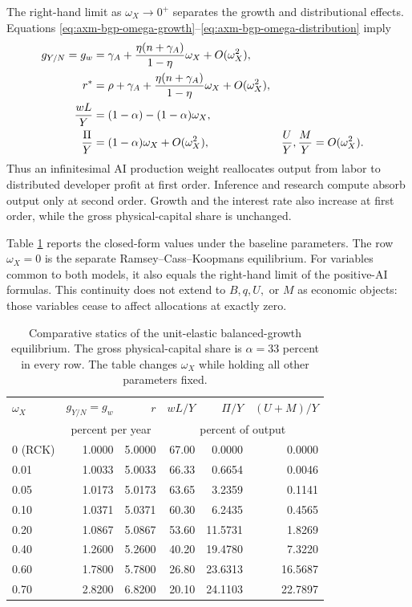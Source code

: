The right-hand limit as \(\omega_X\to0^+\) separates the growth and
distributional effects. Equations
\eqref{eq:axm-bgp-omega-growth}--\eqref{eq:axm-bgp-omega-distribution} imply
\begin{align}
 g_{Y/N}=g_w
 &=\gamma_A+\frac{\eta(n+\gamma_A)}{1-\eta}\omega_X
   +O(\omega_X^2),\notag\\
 r^*&=\rho+\gamma_A+\frac{\eta(n+\gamma_A)}{1-\eta}\omega_X
   +O(\omega_X^2),\notag\\
 \frac{wL}{Y}
 &=(1-\alpha)-(1-\alpha)\omega_X,\notag\\
 \frac{\Pi}{Y}&=(1-\alpha)\omega_X+O(\omega_X^2),
 &\frac{U}{Y},\frac{M}{Y}&=O(\omega_X^2).
 \label{eq:axm-bgp-near-zero}
\end{align}
Thus an infinitesimal AI production weight reallocates output from labor to
distributed developer profit at first order. Inference and research compute
absorb output only at second order. Growth and the interest rate also increase
at first order, while the gross physical-capital share is unchanged.

Table \ref{tab:axm-bgp-omega-comparative-statics} reports the closed-form
values under the baseline parameters. The row \(\omega_X=0\) is the separate
Ramsey--Cass--Koopmans equilibrium. For variables common to both models, it
also equals the right-hand limit of the positive-AI formulas. This continuity
does not extend to \(B,q,U,\) or \(M\) as economic objects: those variables
cease to affect allocations at exactly zero.

\begin{table}[H]
\centering
\small
\begin{tabular}{lrrrrr}
\toprule
\(\omega_X\) & \(g_{Y/N}=g_w\) & \(r\) & \(wL/Y\) & \(\Pi/Y\) & \((U+M)/Y\)\\
 & \multicolumn{2}{c}{percent per year} & \multicolumn{3}{c}{percent of output}\\
\midrule
0 (RCK) & 1.0000 & 5.0000 & 67.00 & 0.0000 & 0.0000\\
0.01 & 1.0033 & 5.0033 & 66.33 & 0.6654 & 0.0046\\
0.05 & 1.0173 & 5.0173 & 63.65 & 3.2359 & 0.1141\\
0.10 & 1.0371 & 5.0371 & 60.30 & 6.2435 & 0.4565\\
0.20 & 1.0867 & 5.0867 & 53.60 & 11.5731 & 1.8269\\
0.40 & 1.2600 & 5.2600 & 40.20 & 19.4780 & 7.3220\\
0.60 & 1.7800 & 5.7800 & 26.80 & 23.6313 & 16.5687\\
0.70 & 2.8200 & 6.8200 & 20.10 & 24.1103 & 22.7897\\
\bottomrule
\end{tabular}
\caption{Comparative statics of the unit-elastic balanced-growth equilibrium.
The gross physical-capital share is \(\alpha=33\) percent in every row. The
table changes \(\omega_X\) while holding all other parameters fixed.}
\label{tab:axm-bgp-omega-comparative-statics}
\end{table}


